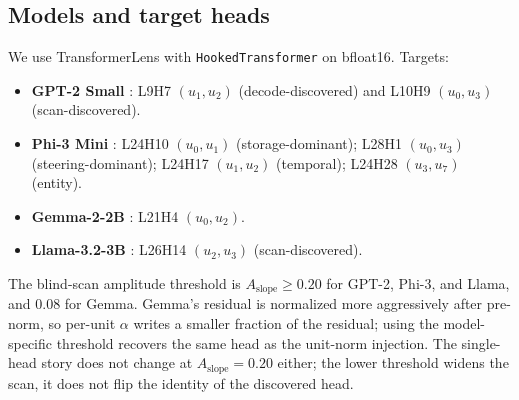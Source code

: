 \subsection{Models and target heads}
\label{sec:method:models}

We use TransformerLens \citep{nanda2022transformerlens} with
\texttt{HookedTransformer} on bfloat16. Targets:

\begin{itemize}
\itemsep0pt
\item \textbf{GPT-2 Small} \citep{radford2019language}: L9H7 $(u_1, u_2)$
(decode-discovered) and L10H9 $(u_0, u_3)$ (scan-discovered).
\item \textbf{Phi-3 Mini} \citep{abdin2024phi3}: L24H10 $(u_0, u_1)$
(storage-dominant); L28H1 $(u_0, u_3)$ (steering-dominant);
L24H17 $(u_1, u_2)$ (temporal); L24H28 $(u_3, u_7)$ (entity).
\item \textbf{Gemma-2-2B} \citep{team2024gemma}: L21H4 $(u_0, u_2)$.
\item \textbf{Llama-3.2-3B} \citep{grattafiori2024llama3}:
L26H14 $(u_2, u_3)$ (scan-discovered).
\end{itemize}

The blind-scan amplitude threshold is $A_{\text{slope}} \geq 0.20$
for GPT-2, Phi-3, and Llama, and $0.08$ for Gemma. Gemma's residual
is normalized more aggressively after pre-norm, so per-unit $\alpha$
writes a smaller fraction of the residual; using the model-specific
threshold recovers the same head as the unit-norm injection. The
single-head story does not change at $A_{\text{slope}} = 0.20$
either; the lower threshold widens the scan, it does not flip the
identity of the discovered head.
